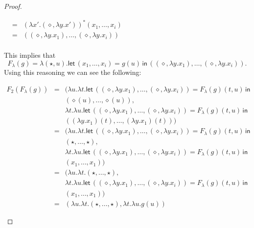\begin{proof}
\begin{report}
\begin{center}
\begin{itemize}
\begin{center}
\begin{math}
\begin{array}{lll}
            & = & (\lambda x'.(\diamond,\lambda y.x'))^*(x_1,\ldots,x_i)\\
            & = & ((\diamond,\lambda y.x_1),\ldots,(\diamond,\lambda y.x_i))\\
          \end{array}
        \end{math}
      \end{center}
      This implies that 
      \[ F_\lambda(g) = \lambda (\star,u).\mathsf{let}\,(x_1,\ldots,x_i) = g(u)\,\mathsf{in}\,((\diamond,\lambda y.x_1),\ldots,(\diamond,\lambda y.x_i)).\]
      Using this reasoning we can see the following:
      \begin{center}
        \begin{math}
          \begin{array}{lll}
            F_2(F_\lambda(g))
            & = & (\lambda u.\lambda t.\mathsf{let}\,((\diamond,\lambda y.x_1),\ldots,(\diamond,\lambda y.x_i)) = F_\lambda(g)(t,u)\,\mathsf{in}\,\\
                  & & (\diamond(u),\ldots,\diamond(u)),\\            
            & & \lambda t.\lambda u.\mathsf{let}\,((\diamond,\lambda y.x_1),\ldots,(\diamond,\lambda y.x_i)) = F_\lambda(g)(t,u)
                \,\mathsf{in}\, \\
            & & ((\lambda y.x_1)(t),\ldots,(\lambda y.x_1)(t)))\\
            & = & (\lambda u.\lambda t.\mathsf{let}\,((\diamond,\lambda y.x_1),\ldots,(\diamond,\lambda y.x_i)) = F_\lambda(g)(t,u)\,\mathsf{in}\,\\
            & & (\star,\ldots,\star),\\            
            & & \lambda t.\lambda u.\mathsf{let}\,((\diamond,\lambda y.x_1),\ldots,(\diamond,\lambda y.x_i)) = F_\lambda(g)(t,u)
                \,\mathsf{in}\, \\
            & & (x_1,\ldots,x_1))\\
            & = & (\lambda u.\lambda t.(\star,\ldots,\star),\\            
            & & \lambda t.\lambda u.\mathsf{let}\,((\diamond,\lambda y.x_1),\ldots,(\diamond,\lambda y.x_i)) = F_\lambda(g)(t,u)
                \,\mathsf{in}\, \\
            & & (x_1,\ldots,x_1))\\
            & = & (\lambda u.\lambda t.(\star,\ldots,\star), \lambda t.\lambda u.g(u))
          \end{array}
        \end{math}

\end{center}
\end{itemize}
\end{center}
\end{report}
\end{proof}
